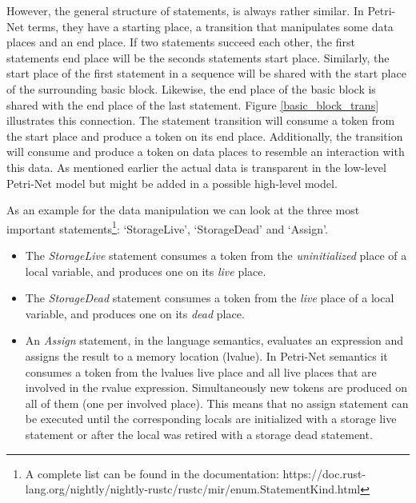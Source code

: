However, the general structure of statements, is always rather similar.
In Petri-Net terms, they have a starting place, a transition that manipulates some data places and an end place.
If two statements succeed each other, the first statements end place will be the seconds statements start place.
Similarly, the start place of the first statement in a sequence will be shared with the start place of the surrounding basic block.
Likewise, the end place of the basic block is shared with the end place of the last statement.
Figure \ref{basic_block_trans} illustrates this connection.
The statement transition will consume a token from the start place and produce a token on its end place.
Additionally, the transition will consume and produce a token on data places to resemble an interaction with this data.
As mentioned earlier the actual data is transparent in the low-level Petri-Net model but might be added in a possible high-level model.

As an example for the data manipulation we can look at the three most important statements\footnote{A complete list can be found in the documentation:\newline
https://doc.rust-lang.org/nightly/nightly-rustc/rustc/mir/enum.StatementKind.html}: `StorageLive', `StorageDead' and `Assign'.
\begin{itemize}
    \item The \textit{StorageLive} statement consumes a token from the \textit{uninitialized} place of a local variable, and produces one on its \textit{live} place.
    \item The \textit{StorageDead} statement consumes a token from the \textit{live} place of a local variable, and produces one on its \textit{dead} place.
    \item An \textit{Assign} statement, in the language semantics, evaluates an expression and assigns the result to a memory location (lvalue).
    In Petri-Net semantics it consumes a token from the lvalues live place and all live places that are involved in the rvalue expression.
    Simultaneously new tokens are produced on all of them (one per involved place).
    This means that no assign statement can be executed until the corresponding locals are initialized with a storage live statement or after the local was retired with a storage dead statement.
\end{itemize}

